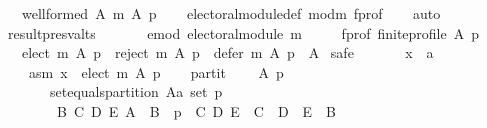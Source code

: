\begin{isabellebody}
\ \ \ {\isachardoublequoteopen}well{\isacharunderscore}{\kern0pt}formed\ A\ {\isacharparenleft}{\kern0pt}m\ A\ p{\isacharparenright}{\kern0pt}{\isachardoublequoteclose}\isanewline
%
\isadelimproof
\ \ %
\endisadelimproof
%
\isatagproof
{}\isamarkupfalse%
\ electoral{\isacharunderscore}{\kern0pt}module{\isacharunderscore}{\kern0pt}def\ mod{\isacharunderscore}{\kern0pt}m\ f{\isacharunderscore}{\kern0pt}prof\isanewline
\ \ \isamarkupfalse%
\ auto%
\endisatagproof
{\isafoldproof}%
%
\isadelimproof
\isanewline
%
\endisadelimproof
\isanewline
{}\isamarkupfalse%
\ result{\isacharunderscore}{\kern0pt}presv{\isacharunderscore}{\kern0pt}alts{\isacharcolon}{\kern0pt}\isanewline
\ \ \isanewline
\ \ \ \ e{\isacharunderscore}{\kern0pt}mod{\isacharcolon}{\kern0pt}\ {\isachardoublequoteopen}electoral{\isacharunderscore}{\kern0pt}module\ m{\isachardoublequoteclose}\ \isanewline
\ \ \ \ f{\isacharunderscore}{\kern0pt}prof{\isacharcolon}{\kern0pt}\ {\isachardoublequoteopen}finite{\isacharunderscore}{\kern0pt}profile\ A\ p{\isachardoublequoteclose}\isanewline
\ \ \ {\isachardoublequoteopen}{\isacharparenleft}{\kern0pt}elect\ m\ A\ p{\isacharparenright}{\kern0pt}\ {\isasymunion}\ {\isacharparenleft}{\kern0pt}reject\ m\ A\ p{\isacharparenright}{\kern0pt}\ {\isasymunion}\ {\isacharparenleft}{\kern0pt}defer\ m\ A\ p{\isacharparenright}{\kern0pt}\ {\isacharequal}{\kern0pt}\ A{\isachardoublequoteclose}\isanewline
%
\isadelimproof
%
\endisadelimproof
%
\isatagproof
{}\isamarkupfalse%
\ {\isacharparenleft}{\kern0pt}safe{\isacharparenright}{\kern0pt}\isanewline
\ \ \isamarkupfalse%
\isanewline
\ \ \ \ x\ {\isacharcolon}{\kern0pt}{\isacharcolon}{\kern0pt}\ {\isachardoublequoteopen}{\isacharprime}{\kern0pt}a{\isachardoublequoteclose}\isanewline
\ \ \isamarkupfalse%
\isanewline
\ \ \ \ asm{\isacharcolon}{\kern0pt}\ {\isachardoublequoteopen}x\ {\isasymin}\ elect\ m\ A\ p{\isachardoublequoteclose}\isanewline
\ \ \isamarkupfalse%
\ partit{\isacharcolon}{\kern0pt}\isanewline
\ \ \ \ {\isachardoublequoteopen}{\isasymforall}A\ p{\isachardot}{\kern0pt}\isanewline
\ \ \ \ \ \ {\isasymnot}\ set{\isacharunderscore}{\kern0pt}equals{\isacharunderscore}{\kern0pt}partition\ {\isacharparenleft}{\kern0pt}A{\isacharcolon}{\kern0pt}{\isacharcolon}{\kern0pt}{\isacharprime}{\kern0pt}a\ set{\isacharparenright}{\kern0pt}\ p\ {\isasymor}\isanewline
\ \ \ \ \ \ \ \ {\isacharparenleft}{\kern0pt}{\isasymexists}B\ C\ D\ E{\isachardot}{\kern0pt}\ A\ {\isacharequal}{\kern0pt}\ B\ {\isasymand}\ p\ {\isacharequal}{\kern0pt}\ {\isacharparenleft}{\kern0pt}C{\isacharcomma}{\kern0pt}\ D{\isacharcomma}{\kern0pt}\ E{\isacharparenright}{\kern0pt}\ {\isasymand}\ C\ {\isasymunion}\ D\ {\isasymunion}\ E\ {\isacharequal}{\kern0pt}\ B{\isacharparenright}{\kern0pt}{\isachardoublequoteclose}\isanewline

\end{isabellebody}
